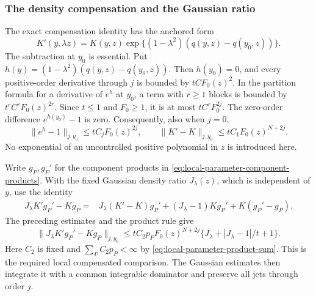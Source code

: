 \subsubsection{The density compensation and the Gaussian ratio}
The exact compensation identity has the anchored form
\[
 K'(y,\lambda z)=K(y,z)
       \exp\{(1-\lambda^2)(q(y,z)-q(y_0,z))\}.
\]
The subtraction at $y_0$ is essential. Put
$h(y)=(1-\lambda^2)(q(y,z)-q(y_0,z))$.
Then $h(y_0)=0$, and every positive-order derivative through $j$
is bounded by $tC F_0(z)^2$. In the partition formula for a derivative
of $e^h$ at $y_0$, a term with $r\ge1$ blocks is bounded by
$t^r C^r F_0(z)^{2r}$. Since $t\le1$ and $F_0\ge1$, it is at most
$tC^r F_0^{2j}$. The zero-order difference $e^{h(y_0)}-1$ is zero.
Consequently, also when $j=0$,
\[
 \|e^h-1\|_{j,y_0}\le tC_jF_0(z)^{2j},\qquad
 \|K'-K\|_{j,y_0}\le tC_1F_0(z)^{N+2j}.
\]
No exponential of an uncontrolled positive polynomial in $z$ is
introduced here.

Write $g_P,g_P'$ for the component products in
\eqref{eq:local-parameter-component-products}. With the fixed
Gaussian density ratio $J_\lambda(z)$, which is independent of $y$,
use the identity
\begin{align*}
 J_\lambda K'g_P'-Kg_P
   ={}&J_\lambda(K'-K)g_P'
       +(J_\lambda-1)Kg_P' +K(g_P'-g_P).
\end{align*}
The preceding estimates and the product rule give
\begin{equation}\label{eq:local-parameter-compensated-bound}
 \|J_\lambda K'g_P'-Kg_P\|_{j,y_0}
 \le t C_2 p_P F_0(z)^{N+2j}
             \{J_\lambda+|J_\lambda-1|/t+1\}.
\end{equation}
Here $C_2$ is fixed and $\sum_PC_2p_P<\infty$ by
\eqref{eq:local-parameter-product-sum}. This is the required local
compensated comparison. The Gaussian estimates then integrate it
with a common integrable dominator and preserve all jets through
order $j$.

